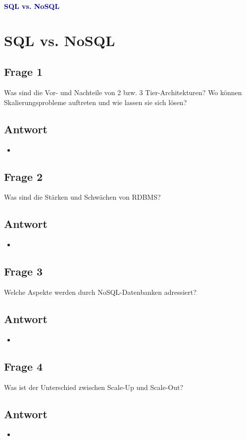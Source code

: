 \textbf{\textcolor{darkblue}{ SQL vs. NoSQL}}~

\section*{SQL vs. NoSQL}
\subsection*{Frage 1}
Was sind die Vor- und Nachteile von 2 bzw. 3 Tier-Architekturen? Wo können Skalierungsprobleme auftreten und wie lassen sie sich lösen?
\subsection*{Antwort}
\begin{itemize}
	\item 
\end{itemize}

\subsection*{Frage 2}
Was sind die Stärken und Schwächen von RDBMS?
\subsection*{Antwort}
\begin{itemize}
	\item 
\end{itemize}

\subsection*{Frage 3}
Welche Aspekte werden durch NoSQL-Datenbanken adressiert?
\subsection*{Antwort}
\begin{itemize}
	\item 
\end{itemize}

\subsection*{Frage 4}
Was ist der Unterschied zwischen Scale-Up und Scale-Out?
\subsection*{Antwort}
\begin{itemize}
	\item 
\end{itemize}

